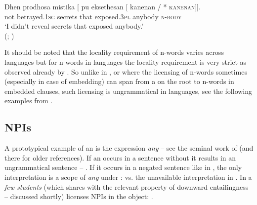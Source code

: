 \documentclass[output=paper, colorlinks, citecolor=brown, newtxmath]{langsci/langscibook}
\begin{document}
\ea \gll Dhen prodhosa mistika [\hspace{-2pt} pu eksethesan [\hspace{-2pt}  kanenan /\hspace{-2pt} *\hspace{-2pt} \textsc{kanenan}]].\\
not betrayed.\textsc{1sg} secrets {} that exposed.\textsc{3pl} {} anybody {} {} \textsc{n-body} {}\\
\glt `I didn't reveal secrets that exposed anybody.'\\\xspace\hfill (; \citealt[18]{giannakidou2017landscape})
\z

\noindent It should be noted that the locality requirement of n-words varies across languages but for n-words in  languages the  locality requirement is very strict  as observed already by \cite{progovac1993negative}. So unlike in ,  or  where the licensing of n-words sometimes (especially in case of  embedding) can span from a  on the root  to n-words in embedded clauses, such licensing is ungrammatical in  languages, see the following examples from .

\ea {}
\z
\z

\subsection{NPIs}\label{npis}

A prototypical example of an  is the  expression \textit{any} -- see the seminal work of \cite{kadmon1993any} (and there for older references). If an  occurs in a sentence without  it results in an ungrammatical sentence -- . If it occurs in a negated sentence like in , the only interpretation is a scope of \textit{any} under :  vs. the unavailable interpretation in . In  a  \textit{few students} (which shares with  the relevant property of downward entailingness -- discussed shortly) licenses NPIs in the object: .
\end{document}
